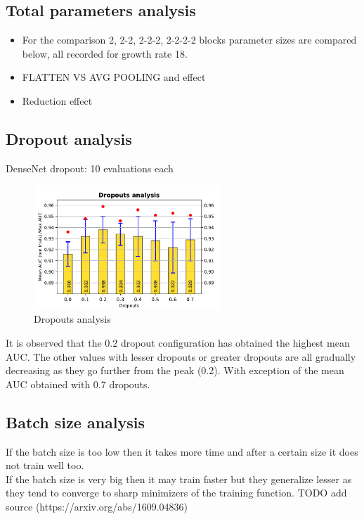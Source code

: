 \subsection{Total parameters analysis}
\begin{itemize}
 \item For the comparison 2, 2-2, 2-2-2, 2-2-2-2 blocks parameter sizes are compared below, all recorded for growth rate 18.
 \item FLATTEN VS AVG POOLING and effect
 \item Reduction effect
\end{itemize}

\subsection{Dropout analysis}
DenseNet dropout: 10 evaluations each \\
\begin{figure}[ht]
\centering
\includegraphics[width=7cm]{images/densenet/simple/densenet_simple_dropout}
\caption{\label{fig:densenet_simple_dropout}Dropouts analysis}
\end{figure}

It is observed that the 0.2 dropout configuration has obtained the highest mean AUC. The other values with lesser dropouts or greater dropouts are all gradually decreasing as they go further from the peak (0.2). 
With exception of the mean AUC obtained with 0.7 dropouts.

\subsection{Batch size analysis}
If the batch size is too low then it takes more time and after a certain size it does not train well too.\\
If the batch size is very big then it may train faster but they generalize lesser as they tend to converge to sharp minimizers of the training function.
TODO add source (https://arxiv.org/abs/1609.04836) 

